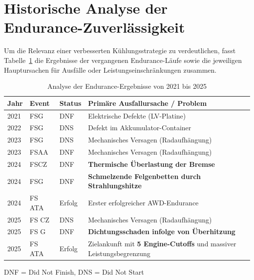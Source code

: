 \section{Historische Analyse der Endurance-Zuverlässigkeit}
\label{sec:historie}

Um die Relevanz einer verbesserten Kühlungsstrategie zu verdeutlichen, fasst Tabelle~\ref{tab:endurance_historie} die Ergebnisse der vergangenen Endurance-Läufe sowie die jeweiligen Hauptursachen für Ausfälle oder Leistungseinschränkungen zusammen.

\begin{table}[htbp]
    \centering
    \caption{Analyse der Endurance-Ergebnisse von 2021 bis 2025}
    \label{tab:endurance_historie}
    \small
    \renewcommand{\arraystretch}{1.25}
    \begin{tabularx}{\textwidth}{|l|l|l|X|}
        \hline
        \textbf{Jahr} & \textbf{Event} & \textbf{Status} & \textbf{Primäre Ausfallursache / Problem} \\
        \hline\hline
        2021 & FSG    & DNF    & Elektrische Defekte (LV-Platine) \\
        2022 & FSG    & DNS    & Defekt im Akkumulator-Container \\
        2023 & FSG    & DNS    & Mechanisches Versagen (Radaufhängung) \\
        2023 & FSAA   & DNF    & Mechanisches Versagen (Radaufhängung) \\
        \hline
        2024 & FSCZ   & DNF    & \textbf{Thermische Überlastung der Bremse} \\
        2024 & FSG    & DNF    & \textbf{Schmelzende Felgenbetten durch Strahlungshitze} \\
        2024 & FS ATA & Erfolg & Erster erfolgreicher AWD-Endurance \\
        \hline
        2025 & FS CZ  & DNS    & Mechanisches Versagen (Radaufhängung) \\
        2025 & FS G   & DNF    & \textbf{Dichtungsschaden infolge von Überhitzung} \\
        2025 & FS ATA & Erfolg & Zielankunft mit \textbf{5 Engine-Cutoffs} und massiver Leistungsbegrenzung \\
        \hline
    \end{tabularx}
\end{table}

\noindent\small{DNF = Did Not Finish, DNS = Did Not Start}
\vspace{1em}

